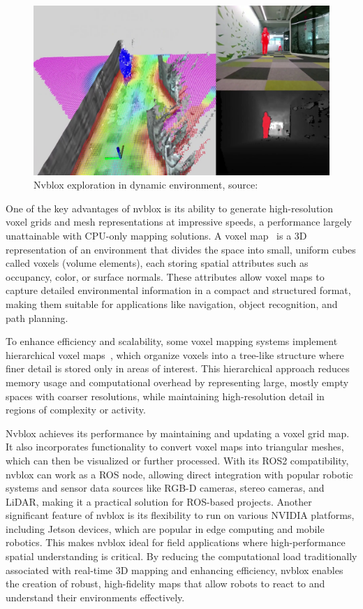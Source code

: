 \begin{figure}[htbp]
    \centering
    \includegraphics[width=150mm, keepaspectratio]{figures_jpg/nvblox_applied_techs.jpg}
    \caption{Nvblox exploration in dynamic environment, source:~\cite{nvblox}}
    \label{fig:nvblox_applied_techs}
\end{figure}

One of the key advantages of nvblox is its ability to generate high-resolution voxel grids and mesh representations at impressive speeds, a performance largely unattainable with CPU-only mapping solutions. A voxel map~\cite{voxelmap} is a 3D representation of an environment that divides the space into small, uniform cubes called voxels (volume elements), each storing spatial attributes such as occupancy, color, or surface normals. These attributes allow voxel maps to capture detailed environmental information in a compact and structured format, making them suitable for applications like navigation, object recognition, and path planning.

To enhance efficiency and scalability, some voxel mapping systems implement hierarchical voxel maps~\cite{hierarchical_voxelmap}, which organize voxels into a tree-like structure where finer detail is stored only in areas of interest. This hierarchical approach reduces memory usage and computational overhead by representing large, mostly empty spaces with coarser resolutions, while maintaining high-resolution detail in regions of complexity or activity.

Nvblox achieves its performance by maintaining and updating a voxel grid map. It also incorporates functionality to convert voxel maps into triangular meshes, which can then be visualized or further processed. With its ROS2 compatibility, nvblox can work as a ROS node, allowing direct integration with popular robotic systems and sensor data sources like RGB-D cameras, stereo cameras, and LiDAR, making it a practical solution for ROS-based projects.
Another significant feature of nvblox is its flexibility to run on various NVIDIA platforms, including Jetson devices, which are popular in edge computing and mobile robotics. This makes nvblox ideal for field applications where high-performance spatial understanding is critical. By reducing the computational load traditionally associated with real-time 3D mapping and enhancing efficiency, nvblox enables the creation of robust, high-fidelity maps that allow robots to react to and understand their environments effectively.

